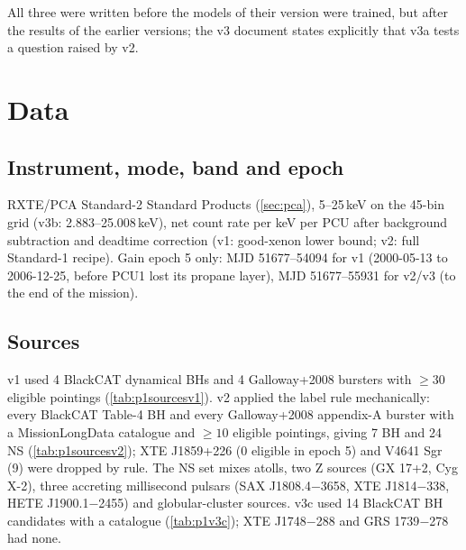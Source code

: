 All three were written before the models of their version were trained, but after the results of the earlier versions;
the v3 document states explicitly that v3a tests a question raised by v2.

\section{Data}
\subsection{Instrument, mode, band and epoch}
RXTE/PCA Standard-2 Standard Products (\cref{sec:pca}), 5--25\,keV on the 45-bin grid (v3b: 2.883--25.008\,keV), net
count rate per keV per PCU after background subtraction and deadtime correction (v1: good-xenon lower bound; v2: full
Standard-1 recipe). Gain epoch 5 only: MJD 51677--54094 for v1 (2000-05-13 to 2006-12-25, before PCU1 lost its propane
layer), MJD 51677--55931 for v2/v3 (to the end of the mission).

\subsection{Sources}
v1 used 4 BlackCAT dynamical BHs and 4 Galloway+2008 bursters with $\ge30$ eligible pointings (\cref{tab:p1sourcesv1}).
v2 applied the label rule mechanically: every BlackCAT Table-4 BH and every Galloway+2008 appendix-A burster with a
MissionLongData catalogue and $\ge10$ eligible pointings, giving 7 BH and 24 NS (\cref{tab:p1sourcesv2}); XTE J1859+226
(0 eligible in epoch 5) and V4641 Sgr (9) were dropped by rule. The NS set mixes atolls, two Z sources (GX 17+2, Cyg X-2),
three accreting millisecond pulsars (SAX J1808.4$-$3658, XTE J1814$-$338, HETE J1900.1$-$2455) and globular-cluster
sources. v3c used 14 BlackCAT BH candidates with a catalogue (\cref{tab:p1v3c}); XTE J1748$-$288 and GRS 1739$-$278 had none.


